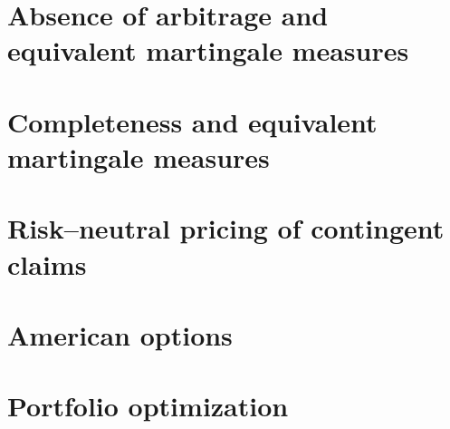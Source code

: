 \documentclass[12pt]{amsart}
\begin{document}
\section{Absence of arbitrage and equivalent martingale measures}
\section{Completeness and equivalent martingale measures}
\section{Risk--neutral pricing of contingent claims}
\section{American options}
\section{Portfolio optimization}
\end{document}
